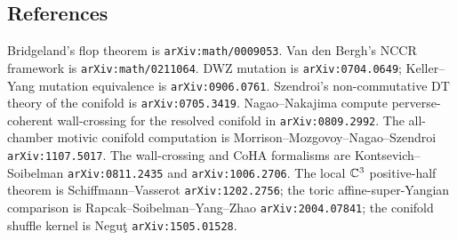 \subsection*{References}

Bridgeland's flop theorem is \texttt{arXiv:math/0009053}.  Van den
Bergh's NCCR framework is \texttt{arXiv:math/0211064}.  DWZ mutation is
\texttt{arXiv:0704.0649}; Keller--Yang mutation equivalence is
\texttt{arXiv:0906.0761}.  Szendroi's non-commutative DT theory of the
conifold is \texttt{arXiv:0705.3419}.  Nagao--Nakajima compute
perverse-coherent wall-crossing for the resolved conifold in
\texttt{arXiv:0809.2992}.  The all-chamber motivic conifold computation
is Morrison--Mozgovoy--Nagao--Szendroi \texttt{arXiv:1107.5017}.  The
wall-crossing and CoHA formalisms are Kontsevich--Soibelman
\texttt{arXiv:0811.2435} and \texttt{arXiv:1006.2706}.  The local
$\mathbb{C}^3$ positive-half theorem is Schiffmann--Vasserot
\texttt{arXiv:1202.2756}; the toric affine-super-Yangian comparison is
Rapcak--Soibelman--Yang--Zhao \texttt{arXiv:2004.07841}; the conifold
shuffle kernel is Negu\c{t} \texttt{arXiv:1505.01528}.
